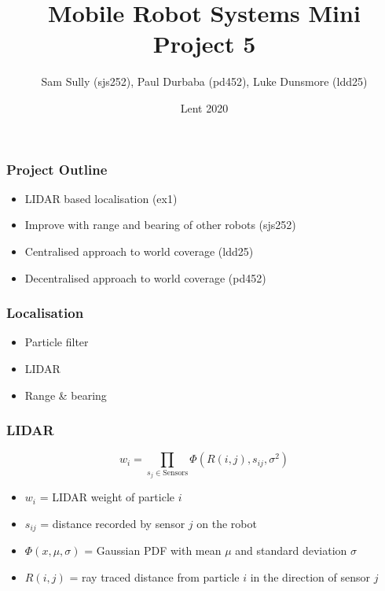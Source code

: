 \documentclass{beamer}
\title{Mobile Robot Systems Mini Project 5}
\author{Sam Sully (sjs252), Paul Durbaba (pd452), Luke Dunsmore (ldd25)}
\date{Lent 2020}
\begin{document}
		
	\frame{\titlepage}
		
	\begin{frame}
		\frametitle{Project Outline}
		\pause
		\begin{itemize}
			\item<2-> LIDAR based localisation (ex1)
			\item<3-> Improve with range and bearing of other robots (sjs252)
			\item<4-> Centralised approach to world coverage (ldd25)
			\item<5-> Decentralised approach to world coverage (pd452)
		\end{itemize}
	\end{frame}
	\begin{frame}
		\frametitle{Localisation}
		\pause
		\begin{itemize}
			\item<2->Particle filter
			\item<3->LIDAR
			\item<4->Range \& bearing
		\end{itemize}
	\end{frame}
	\begin{frame}
		\frametitle{LIDAR}
		\[
		w_i = \prod_{s_{j} \in \mathrm{Sensors}}\Phi(R(i,j), s_{ij}, \sigma^2)
		\]
		\begin{itemize}
			\item $w_i$ = LIDAR weight of particle $i$
			\item $s_{ij}$ = distance recorded by sensor $j$ on the robot
			\item $\Phi(x,\mu,\sigma)$ = Gaussian PDF with mean $\mu$ and standard deviation $\sigma$ 
			\item $R(i,j)$ = ray traced distance from particle $i$ in the direction of sensor $j$
		\end{itemize}
	\end{frame}
\end{document}
